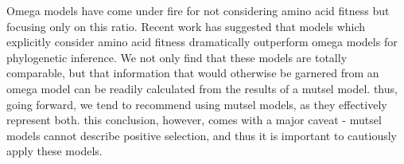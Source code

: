 \documentclass[11pt]{article}
\begin{document}



Omega models have come under fire for not considering amino acid fitness but focusing only on this ratio. Recent work has suggested that models which explicitly consider amino acid fitness dramatically outperform omega models for phylogenetic inference. We not only find that these models are totally comparable, but that information that would otherwise be garnered from an omega model can be readily calculated from the results of a mutsel model. thus, going forward, we tend to recommend using mutsel models, as they effectively represent both. this conclusion, however, comes with a major caveat - mutsel models cannot describe positive selection, and thus it is important to cautiously apply these models. 
\end{document}
